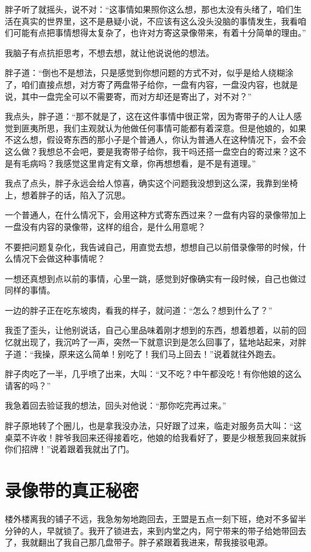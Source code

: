 胖子听了就摇头，说不对：“这事情如果照你这么想，那也太没有头绪了，咱们生活在真实的世界里，这不是悬疑小说，不应该有这么没头没脑的事情发生，我看咱们可能有点把事情想得太复杂了，也许对方寄这录像带来，有着十分简单的理由。”

我脑子有点抗拒思考，不想去想，就让他说说他的想法。

胖子道：“倒也不是想法，只是感觉到你想问题的方式不对，似乎是给人绕糊涂了，咱们直接点想，对方寄了两盘带子给你，一盘有内容，一盘没内容，也就是说，其中一盘完全可以不需要寄，而对方却还是寄出了，对不对？”

我点头，胖子道：“那不就是了，这在这件事情中很正常，因为寄带子的人让人感觉到匪夷所思，我们主观就认为他做任何事情可能都有着深意。但是他娘的，如果不这么想，假设寄东西的那小子是个普通人，你认为普通人在这种情况下，会不会这么做？我想总不会吧，要是我寄带子给你，我干吗还搭一盘空白的寄过来？这不是有毛病吗？我感觉这里肯定有文章，你再想想看，是不是有道理。”

我点了点头，胖子永远会给人惊喜，确实这个问题我没想到这么深，我靠到坐椅上，想着胖子的话，陷入了沉思。

一个普通人，在什么情况下，会用这种方式寄东西过来？一盘有内容的录像带加上一盘没有内容的录像带，这样的组合，是什么用意呢？

不要把问题复杂化，我告诫自己，用直觉去想，想想自己以前借录像带的时候，什么情况下会做这种事情呢？

一想还真想到点以前的事情，心里一跳，感觉到好像确实有一段时候，自己也做过同样的事情。

一边的胖子正在吃东坡肉，看我的样子，就问道：“怎么？想到什么了？”

我歪了歪头，让他别说话，自己心里品味着刚才想到的东西，想着想着，以前的回忆就出现了，我沉吟了一声，突然一下就意识到是怎么回事了，猛地站起来，对胖子道：“我操，原来这么简单！别吃了！我们马上回去！”说着就往外跑去。

胖子肉吃了一半，几乎喷了出来，大叫：“又不吃？中午都没吃！有你他娘的这么请客的吗？”

我急着回去验证我的想法，回头对他说：“那你吃完再过来。”

胖子原地转了个圈儿，也是拿我没办法，只好跟了过来，临走对服务员大叫：“这桌菜不许收！胖爷我回来还得接着吃，他娘的给我看好了，要是少根葱我回来就拆你们招牌！”说着跟着我就出了门。

\chapter{录像带的真正秘密}

楼外楼离我的铺子不远，我急匆匆地跑回去，王盟是五点一刻下班，绝对不多留半分钟的人，早就锁了。我开了锁进去，来到内堂之内，阿宁带来的带子给她带回去了，我就翻出了我自己那几盘带子。胖子紧跟着我进来，帮我接驳电源。

